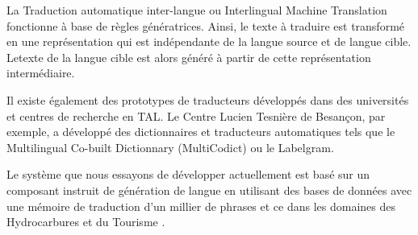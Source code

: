 \documentclass[french]{textolivre}
\begin{document}
La Traduction automatique inter-langue ou Interlingual Machine Translation fonctionne à base de règles génératrices. Ainsi, le texte à traduire est transformé en une représentation qui est indépendante de la langue source et de langue cible. Letexte de la langue cible est alors généré à partir de cette représentation intermédiaire.

Il existe également des prototypes de traducteurs développés dans des universités et centres de recherche en TAL. Le Centre Lucien Tesnière de Besançon, par exemple, a développé des  dictionnaires et traducteurs automatiques tels que le Multilingual Co-built Dictionnary (MultiCodict) ou le Labelgram.

Le système que nous essayons de développer actuellement est basé sur un composant instruit de génération de langue en utilisant des bases de données avec une mémoire de traduction d’un millier de phrases et ce dans les domaines des Hydrocarbures et du Tourisme \cite[p. 111, 141]{bouhadiba2008}.
\end{document}
